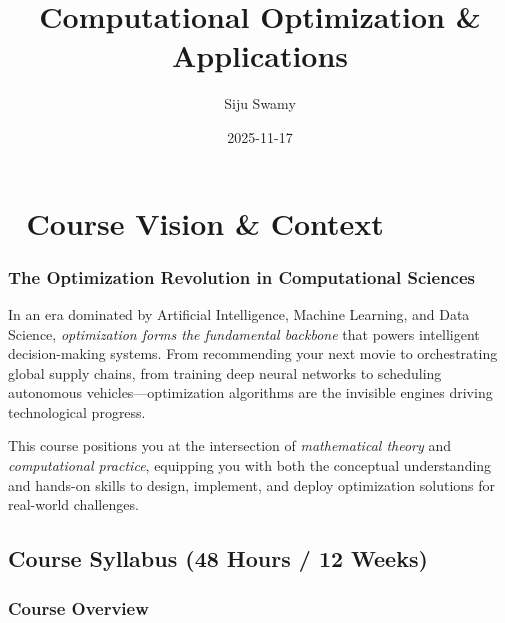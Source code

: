 \documentclass[
  letterpaper,
  DIV=11,
  numbers=noendperiod]{scrreprt}
\title{Computational Optimization \& Applications}
\author{Siju Swamy}
\date{2025-11-17}
\renewcommand*\contentsname{Table of contents}
\newcommand\contentsname{Table of contents}
\begin{document}
\maketitle

\renewcommand*\contentsname{Table of contents}
{
\hypersetup{linkcolor=}
\setcounter{tocdepth}{2}
\tableofcontents
}


\chapter*{🎯 Course Vision \& Context}\label{course-vision-context}


\subsection*{The Optimization Revolution in Computational
Sciences}\label{the-optimization-revolution-in-computational-sciences}

In an era dominated by Artificial Intelligence, Machine Learning, and
Data Science, \emph{optimization forms the fundamental backbone} that
powers intelligent decision-making systems. From recommending your next
movie to orchestrating global supply chains, from training deep neural
networks to scheduling autonomous vehicles---optimization algorithms are
the invisible engines driving technological progress.

This course positions you at the intersection of \emph{mathematical
theory} and \emph{computational practice}, equipping you with both the
conceptual understanding and hands-on skills to design, implement, and
deploy optimization solutions for real-world challenges.

\section*{Course Syllabus (48 Hours / 12
Weeks)}\label{course-syllabus-48-hours-12-weeks}


\subsection*{Course Overview}\label{course-overview}
\end{document}
